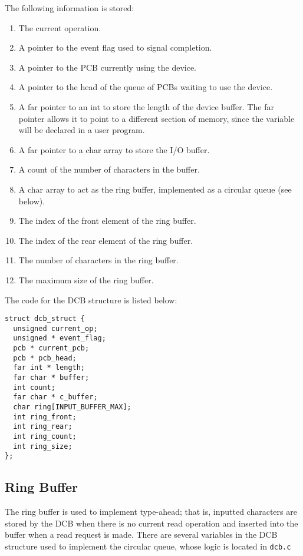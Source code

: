 The following information is stored:
\begin{enumerate}
    \item The current operation.
    \item A pointer to the event flag used to signal completion.
    \item A pointer to the PCB currently using the device.
    \item A pointer to the head of the queue of PCBs waiting to use the device.
    \item A far pointer to an int to store the length of the device buffer. The far pointer allows it to point to a different section of memory, since the variable will be declared in a user program.
    \item A far pointer to a char array to store the I/O buffer.
    \item A count of the number of characters in the buffer.
    \item A char array to act as the ring buffer, implemented as a circular queue (see below).
    \item The index of the front element of the ring buffer.
    \item The index of the rear element of the ring buffer.
    \item The number of characters in the ring buffer.
    \item The maximum size of the ring buffer.
\end{enumerate}

The code for the DCB structure is listed below:
\begin{lstlisting}
struct dcb_struct {
  unsigned current_op;
  unsigned * event_flag;
  pcb * current_pcb;
  pcb * pcb_head;
  far int * length;
  far char * buffer;
  int count;
  far char * c_buffer;
  char ring[INPUT_BUFFER_MAX];
  int ring_front;
  int ring_rear;
  int ring_count;
  int ring_size;
};
\end{lstlisting}

\subsection{Ring Buffer}

The ring buffer is used to implement type-ahead; that is, inputted characters are stored by the DCB when there is no current read operation and inserted into the buffer when a read request is made. There are several variables in the DCB structure used to implement the circular queue, whose logic is located in {\tt dcb.c}
